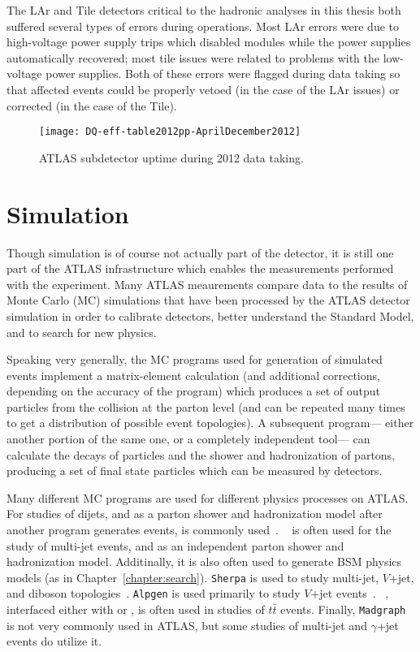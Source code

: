 The LAr and Tile detectors critical to the hadronic analyses in this thesis both suffered several types of errors during operations. Most LAr errors were due to high-voltage power supply trips which disabled modules while the power supplies automatically recovered; most tile issues were related to problems with the low-voltage power supplies. Both of these errors were flagged during data taking so that affected events could be properly vetoed (in the case of the LAr issues) or corrected (in the case of the Tile).


\begin{figure}
\centering
\texttt{[image: DQ-eff-table2012pp-AprilDecember2012]}
\caption{ATLAS subdetector uptime during 2012 data taking.}
\label{fig:detector:uptime}
\end{figure}


\section{Simulation}

Though simulation is of course not actually part of the detector, it is still one part of the ATLAS infrastructure which enables the measurements performed with the experiment. Many ATLAS meaurements compare data to the results of Monte Carlo (MC) simulations that have been processed by the ATLAS detector simulation in order to calibrate detectors, better understand the Standard Model, and to search for new physics. 

Speaking very generally, the MC programs used for generation of simulated events implement a matrix-element calculation (and additional corrections, depending on the accuracy of the program) which produces a set of output particles from the collision at the parton level (and can be repeated many times to get a distribution of possible event topologies). A subsequent program--- either another portion of the same one, or a completely independent tool--- can calculate the decays of particles and the shower and hadronization of partons, producing a set of final state particles which can be measured by detectors.

Many different MC programs are used for different physics processes on ATLAS. For studies of dijets, and as a parton shower and hadronization model after another program generates events, \Pythia is commonly used~\cite{pythia,Sjostrand:2007gs}. \Herwigpp~\cite{Herwig} is often used for the study of multi-jet events, and as an independent parton shower and hadronization model. Additinally, it is also often used to generate BSM physics models (as in Chapter~\ref{chapter:search}). \texttt{Sherpa} is used to study multi-jet, $V$+jet, and diboson topologies~\cite{Gleisberg:2008ta}. \texttt{Alpgen} is used primarily to study $V$+jet events~\cite{Mangano:2002ea}.  \Powheg~\cite{pow1,pow2,pow3}, interfaced either with \Pythia or \Herwig, is often used in studies of $t\bar{t}$ events. Finally, \texttt{Madgraph}~\cite{MadGraph} is not very commonly used in ATLAS, but some studies of multi-jet and $\gamma$+jet events do utilize it.


